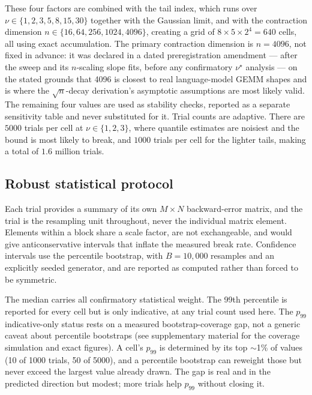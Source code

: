 These four factors are combined with the tail index, which runs over
$\nu \in \{1, 2, 3, 5, 8, 15, 30\}$ together with the Gaussian limit, and with
the contraction dimension $n \in \{16, 64, 256, 1024, 4096\}$, creating a grid of
$8 \times 5 \times 2^4 = 640$ cells, all using exact accumulation. The primary
contraction dimension is $n = 4096$, not fixed in advance: it was declared in a
dated preregistration amendment --- after the sweep and its $n$-scaling slope
fits, before any confirmatory $\nu^\star$ analysis --- on the stated grounds that
4096 is closest to real language-model GEMM shapes and is where the
$\sqrt{n}$-decay derivation's asymptotic assumptions are most likely valid.
The remaining four values are used as stability checks, reported as a separate
sensitivity table and never substituted for it. Trial counts are adaptive. There
are $5000$ trials per cell at $\nu \in \{1, 2, 3\}$, where quantile estimates are
noisiest and the bound is most likely to break, and $1000$ trials per cell for
the lighter tails, making a total of $1.6$ million trials.

\subsection{Robust statistical protocol}
\label{sec:method:stats}

Each trial provides a summary of its own $M \times N$ backward-error matrix, and
the trial is the resampling unit throughout, never the individual matrix element.
Elements within a block share a scale factor, are not exchangeable, and would
give anticonservative intervals that inflate the measured break rate. Confidence
intervals use the percentile bootstrap, with $B = 10{,}000$ resamples and an
explicitly seeded generator, and are reported as computed rather than forced to
be symmetric.

 The median carries all confirmatory statistical weight. The 99th
percentile is reported for every cell but is only indicative, at any trial count
used here. The $p_{99}$ indicative-only status rests on a measured
bootstrap-coverage gap, not a generic caveat about percentile bootstraps (see
supplementary material for the coverage simulation and exact figures). A cell's
$p_{99}$ is determined by its top $\sim$1\% of values (10 of 1000 trials, 50 of 5000),
and a percentile bootstrap can reweight those but never exceed the largest value
already drawn. The gap is real and in the predicted direction but modest; more
trials help $p_{99}$ without closing it.
